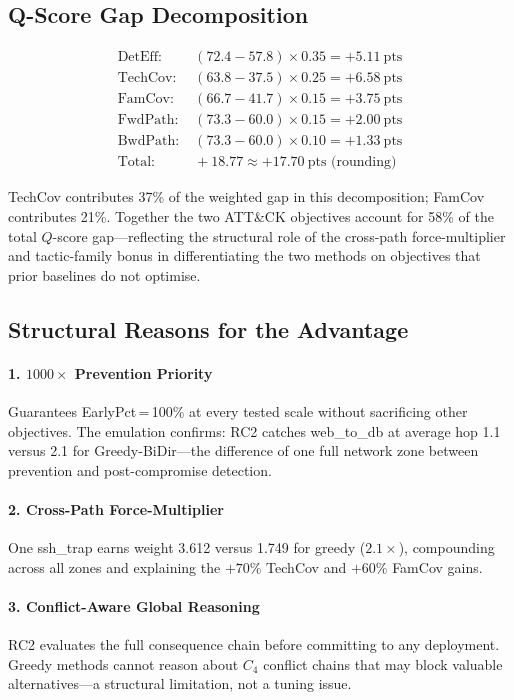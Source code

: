 \documentclass[journal]{IEEEtran}
\newcommand{\qscore}{$Q$-score}
\begin{document}
\subsection{Q-Score Gap Decomposition}
\begin{align*}
\text{DetEff:}  &\;(72.4-57.8)\times0.35 = +5.11~\text{pts}\\
\text{TechCov:} &\;(63.8-37.5)\times0.25 = +6.58~\text{pts}\\
\text{FamCov:}  &\;(66.7-41.7)\times0.15 = +3.75~\text{pts}\\
\text{FwdPath:} &\;(73.3-60.0)\times0.15 = +2.00~\text{pts}\\
\text{BwdPath:} &\;(73.3-60.0)\times0.10 = +1.33~\text{pts}\\
\text{Total:}   &\;+18.77\approx+17.70~\text{pts (rounding)}
\end{align*}

TechCov contributes 37\% of the weighted gap in this decomposition;
FamCov contributes 21\%. Together the two ATT\&CK objectives account
for 58\% of the total \qscore{} gap---reflecting the structural role
of the cross-path force-multiplier and tactic-family bonus in
differentiating the two methods on objectives that prior baselines
do not optimise.

\subsection{Structural Reasons for the Advantage}

\paragraph{1. $1000\times$ Prevention Priority}
Guarantees EarlyPct\,=\,100\% at every tested scale without
sacrificing other objectives. The emulation confirms: RC2 catches
web\_to\_db at average hop 1.1 versus 2.1 for Greedy-BiDir---the
difference of one full network zone between prevention and
post-compromise detection.

\paragraph{2. Cross-Path Force-Multiplier}
One ssh\_trap earns weight 3.612 versus 1.749 for greedy
($2.1\times$), compounding across all zones and explaining the
$+70\%$ TechCov and $+60\%$ FamCov gains.

\paragraph{3. Conflict-Aware Global Reasoning}
RC2 evaluates the full consequence chain before committing to
any deployment. Greedy methods cannot reason about $C_4$ conflict
chains that may block valuable alternatives---a structural
limitation, not a tuning issue.
\end{document}
